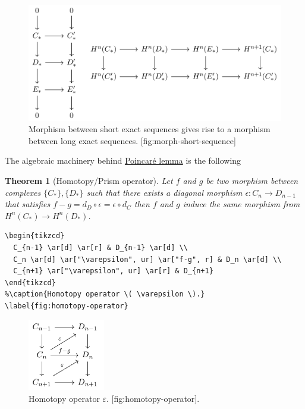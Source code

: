 \documentclass[11pt]{article}
\newtheorem{theorem}{Theorem}
\begin{document}
\begin{figure}[htbp]
\centering
\includegraphics[width=1.0\textwidth]{../img/2017-08-13-morph-short-sequence.png}
\caption{Morphism between short exact sequences gives rise to a morphism between long exact sequences. [fig:morph-short-sequence]}
\end{figure}


The algebraic machinery behind \href{http://mathworld.wolfram.com/PoincaresLemma.html}{Poincaré lemma} is the following

\begin{theorem}[Homotopy/Prism operator]
\label{thm:prism-operator}
Let \(f\) and \(g\) be two morphism between complexes \(\{C_*\}, \{D_*\}\) such that there
exists a diagonal morphism \(\epsilon:  C_n \longrightarrow  D_{n-1}\) that satisfies
\(f-g = d_D \circ \epsilon = \epsilon \circ d_C\) then \(f\) and \(g\) induce the same
morphism from \(H^n(C_*)
\longrightarrow  H^n(D_*)\).
\end{theorem}

\begin{verbatim}
\begin{tikzcd}
  C_{n-1} \ar[d] \ar[r] & D_{n-1} \ar[d] \\
  C_n \ar[d] \ar["\varepsilon", ur] \ar["f-g", r] & D_n \ar[d] \\
  C_{n+1} \ar["\varepsilon", ur] \ar[r] & D_{n+1} 
\end{tikzcd}
%\caption{Homotopy operator \( \varepsilon \).}
\label{fig:homotopy-operator}
\end{verbatim}


\begin{figure}[htbp]
\centering
\includegraphics[width=0.30\textwidth]{../img/2017-08-13-homotopy-operator.png}
\caption{Homotopy operator \(\varepsilon\). [fig:homotopy-operator].}
\end{figure}
\end{document}
